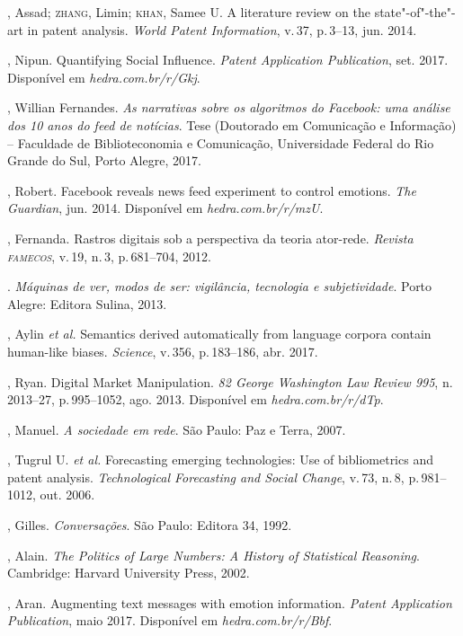 \begin{bibliohedra}
, Assad; \textsc{zhang}, Limin; \textsc{khan}, Samee U. A literature review on the state"-of"-the"-art in patent analysis. \textit{World Patent Information}, v.\,37, p.\,3--13,  jun. 2014.

, Nipun. Quantifying Social Influence. \textit{Patent Application Publication}, set. 2017. Disponível em \textit{hedra.com.br/r/Gkj}.

, Willian Fernandes. \textit{As narrativas sobre os algoritmos do Facebook: uma
análise dos 10 anos do feed de notícias}. Tese (Doutorado em Comunicação e Informação) --
Faculdade de Biblioteconomia e Comunicação, Universidade Federal do Rio Grande do Sul,
Porto Alegre, 2017.

, Robert. Facebook reveals news feed experiment to control
emotions. \textit{The Guardian}, jun. 2014. Disponível em \textit{hedra.com.br/r/mzU}.

, Fernanda. Rastros digitais sob a perspectiva da teoria
ator-rede. \textit{Revista \textsc{famecos}}, v.\,19, n.\,3, p.\,681--704, 2012.

\titidem. \textit{Máquinas de ver, modos de ser: vigilância,
tecnologia e subjetividade}. Porto Alegre: Editora Sulina, 2013.

, Aylin \textit{et al.} Semantics derived automatically from
language corpora contain human-like biases. \textit{Science}, v.\,356, p.\,183--186, abr. 2017.

, Ryan. Digital Market Manipulation. \textit{82 George Washington
Law Review 995}, n.\,2013--27, p.\,995--1052, ago. 2013. Disponível em \textit{hedra.com.br/r/dTp}.

, Manuel. \textit{A sociedade em rede}. São Paulo: Paz e Terra, 2007.

, Tugrul U. \textit{et al.} Forecasting emerging technologies: Use
of bibliometrics and patent analysis. \textit{Technological Forecasting and
Social Change}, v.\,73, n.\,8, p.\,981--1012, out. 2006.

, Gilles. \textit{Conversações}. São Paulo: Editora 34, 1992.

, Alain. \textit{The Politics of Large Numbers: A History of
Statistical Reasoning}. Cambridge: Harvard University Press, 2002.

, Aran. Augmenting text messages with emotion information. \textit{Patent Application Publication}, maio 2017. Disponível em \textit{hedra.com.br/r/Bbf}.


\end{bibliohedra}
